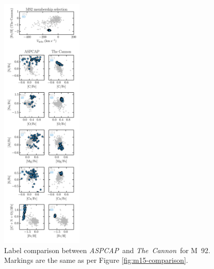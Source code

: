 \documentclass[12pt,preprint]{aastex}
\newcommand{\project}[1]{\textsl{#1}}
\newcommand{\TheCannon}{\project{The~Cannon}}
\newcommand{\acronym}[1]{{\small{#1}}}
\newcommand{\aspcap}{\project{\acronym{ASPCAP}}}
\begin{document}
\begin{figure}[p]
\centering
\includegraphics[width=0.35\textwidth]{M92_comparison.pdf}
\caption{Label comparison between \aspcap\ and \TheCannon\ for M~92.
Markings are the same as per Figure \ref{fig:m15-comparison}.
\label{fig:m92-comparison}}
\end{figure}

\clearpage
\end{document}
